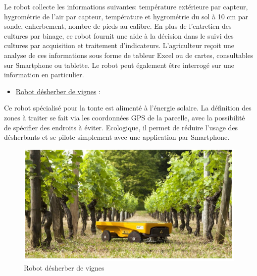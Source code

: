 \begin{flushleft}
	Le robot collecte les informations suivantes: température extérieure par capteur,	hygrométrie de l'air par capteur, température et hygrométrie du sol à 10 cm par sonde, enherbement, nombre de pieds au calibre. En plus de l'entretien des
	cultures par binage, ce robot fournit une aide à la décision dans le suivi des cultures par acquisition et traitement d'indicateurs. L’agriculteur reçoit une analyse de ces informations sous forme de tableur Excel ou de cartes, consultables sur Smartphone ou tablette. Le robot peut également être interrogé sur une information en particulier.
		\begin{itemize}
			\item 	\underline{Robot désherber de vignes} :
		\end{itemize}
	
	Ce robot spécialisé pour la tonte est alimenté à l'énergie solaire. La définition des zones à traiter se fait via les coordonnées GPS de la parcelle, avec la possibilité de spécifier des endroits à éviter. Ecologique, il permet de réduire l'usage des désherbants et se pilote simplement avec une application par
	Smartphone.
	\begin{figure}[h]
		\centering
		\includegraphics{chapitres/images/Robot-desherber.PNG}
		\caption{Robot désherber de vignes}
		\label{fig:labelname}
	\end{figure}


\end{flushleft}
